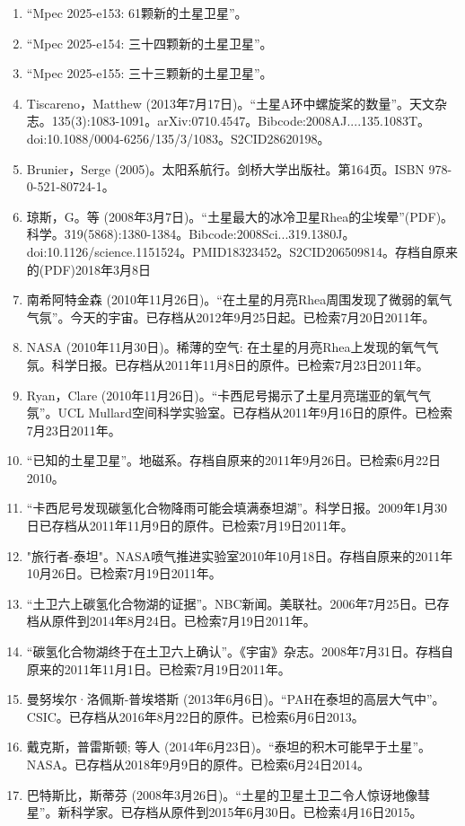 \begin{enumerate}
\item “Mpec 2025-e153: 61颗新的土星卫星”。
\item “Mpec 2025-e154: 三十四颗新的土星卫星”。
\item “Mpec 2025-e155: 三十三颗新的土星卫星”。
\item Tiscareno，Matthew (2013年7月17日)。“土星A环中螺旋桨的数量”。天文杂志。135(3):1083-1091。arXiv:0710.4547。Bibcode:2008AJ....135.1083T。doi:10.1088/0004-6256/135/3/1083。S2CID28620198。 
\item Brunier，Serge (2005)。太阳系航行。剑桥大学出版社。第164页。ISBN 978-0-521-80724-1。
\item 琼斯，G。等 (2008年3月7日)。“土星最大的冰冷卫星Rhea的尘埃晕”(PDF)。科学。319(5868):1380-1384。Bibcode:2008Sci...319.1380J。doi:10.1126/science.1151524。PMID18323452。S2CID206509814。存档自原来的(PDF)2018年3月8日   
\item 南希阿特金森 (2010年11月26日)。“在土星的月亮Rhea周围发现了微弱的氧气气氛”。今天的宇宙。已存档从2012年9月25日起。已检索7月20日2011年。
\item NASA (2010年11月30日)。稀薄的空气: 在土星的月亮Rhea上发现的氧气气氛。科学日报。已存档从2011年11月8日的原件。已检索7月23日2011年。
\item Ryan，Clare (2010年11月26日)。“卡西尼号揭示了土星月亮瑞亚的氧气气氛”。UCL Mullard空间科学实验室。已存档从2011年9月16日的原件。已检索7月23日2011年。
\item “已知的土星卫星”。地磁系。存档自原来的2011年9月26日。已检索6月22日2010。
\item “卡西尼号发现碳氢化合物降雨可能会填满泰坦湖”。科学日报。2009年1月30日已存档从2011年11月9日的原件。已检索7月19日2011年。
\item "旅行者-泰坦"。NASA喷气推进实验室2010年10月18日。存档自原来的2011年10月26日。已检索7月19日2011年。
\item “土卫六上碳氢化合物湖的证据”。NBC新闻。美联社。2006年7月25日。已存档从原件到2014年8月24日。已检索7月19日2011年。
\item “碳氢化合物湖终于在土卫六上确认”。《宇宙》杂志。2008年7月31日。存档自原来的2011年11月1日。已检索7月19日2011年。
\item 曼努埃尔·洛佩斯-普埃塔斯 (2013年6月6日)。“PAH在泰坦的高层大气中”。CSIC。已存档从2016年8月22日的原件。已检索6月6日2013。
\item 戴克斯，普雷斯顿; 等人 (2014年6月23日)。“泰坦的积木可能早于土星”。NASA。已存档从2018年9月9日的原件。已检索6月24日2014。
\item 巴特斯比，斯蒂芬 (2008年3月26日)。“土星的卫星土卫二令人惊讶地像彗星”。新科学家。已存档从原件到2015年6月30日。已检索4月16日2015。

\end{enumerate}
